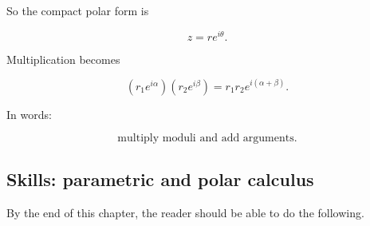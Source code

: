 So the compact polar form is

\[
\boxed{
z=re^{i\theta}.
}
\]

Multiplication becomes

\[
\boxed{
(r_1e^{i\alpha})(r_2e^{i\beta})
=
r_1r_2e^{i(\alpha+\beta)}.
}
\]

In words:

\[
\boxed{
\text{multiply moduli and add arguments.}
}
\]

\subsection{Skills: parametric and polar calculus}
\label{subsec:skills-parametric-polar-calculus}

By the end of this chapter, the reader should be able to do the following.

